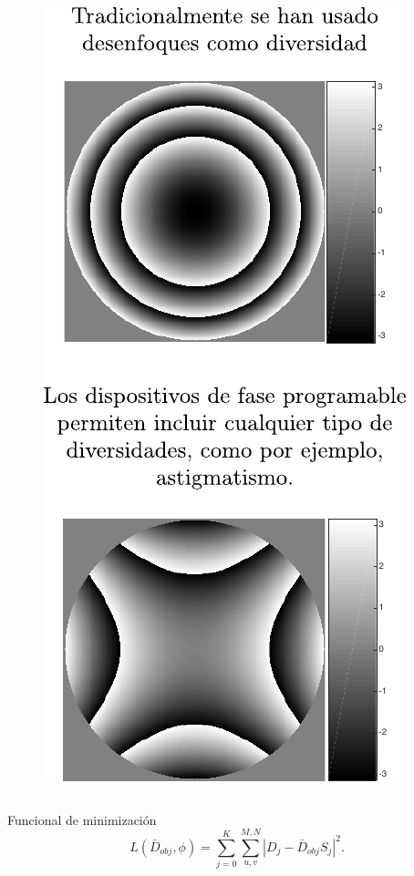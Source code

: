 \documentclass[xcolor=table,serif]{beamer}
\begin{document}
{\begin{columns}
\begin{figure}
     \includegraphics[scale=.4]{Figures/presentation/diversities.pdf}
   \end{figure}
\end{columns}
\pause
\begin{block}{\centering Funcional de minimizaci\'on}
   \begin{equation*}\label{eq:metric}
   L(\bar{D}_{obj}, \phi)= \sum_{j=0}^{K} \sum_{u,v}^{M,N}  \left |D_{j} - \bar{D}_{obj} S_{j} \right | ^2.
   \end{equation*} 
\end{block}
}
\end{document}

